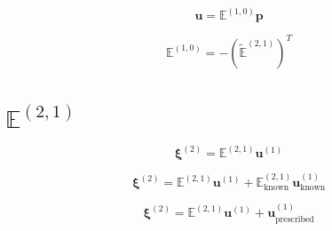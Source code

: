 \documentclass[a4paper,10pt]{scrreprt}
\begin{document}
\begin{equation}
    \mathbf{u} = \mathbb{E}^{(1,0)} \mathbf{p}
\end{equation}

\begin{equation}
    \mathbb{E}^{(1,0)} = -\left(\tilde{\mathbb{E}}^{(2,1)}\right)^T
\end{equation}

\section{$\mathbb{E}^{(2,1)}$}

\begin{equation}
    \mathbf{\xi}^{(2)} = \mathbb{E}^{(2,1)} \mathbf{u}^{(1)}
\end{equation}

\begin{equation}
    \mathbf{\xi}^{(2)} = \mathbb{E}^{(2,1)} \mathbf{u}^{(1)} + \mathbb{E}^{(2,1)}_{\text{known}} \mathbf{u}^{(1)}_{\text{known}}
\end{equation}

\begin{equation}
    \mathbf{\xi}^{(2)} = \mathbb{E}^{(2,1)} \mathbf{u}^{(1)} + \mathbf{u}^{(1)}_{\text{prescribed}}
\end{equation}
\end{document}
